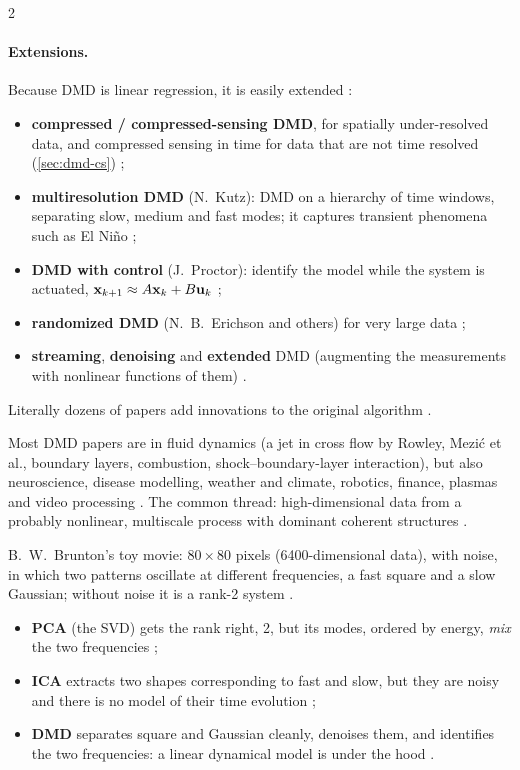 \begin{paracol}{2}
\paragraph{Extensions.} Because DMD is linear regression, it is easily extended :
\begin{itemize}
  \item \textbf{compressed / compressed-sensing DMD}, for spatially under-resolved data, and compressed
        sensing in time for data that are not time resolved (\cref{sec:dmd-cs}) ;
  \item \textbf{multiresolution DMD} (N.~Kutz): DMD on a hierarchy of time windows, separating slow,
        medium and fast modes; it captures transient phenomena such as El Ni\~no ;
  \item \textbf{DMD with control} (J.~Proctor): identify the model while the system is actuated,
        $\mathbf{x}_{k+1}\approx A\mathbf{x}_k+B\mathbf{u}_k$ ;
  \item \textbf{randomized DMD} (N.~B.~Erichson and others) for very large data ;
  \item \textbf{streaming}, \textbf{denoising} and \textbf{extended} DMD (augmenting the measurements with
        nonlinear functions of them) .
\end{itemize}
Literally dozens of papers add innovations to the original algorithm .

\begin{application}
Most DMD papers are in fluid dynamics (a jet in cross flow by Rowley, Mezi\'c et al., boundary layers,
combustion, shock--boundary-layer interaction), but also neuroscience, disease modelling, weather and
climate, robotics, finance, plasmas and video processing . The common
thread: high-dimensional data from a probably nonlinear, multiscale process with dominant coherent
structures .
\end{application}

\begin{casestudy}
B.~W.~Brunton's toy movie: $80\times80$ pixels (6400-dimensional data), with noise, in which two patterns
oscillate at different frequencies, a fast square and a slow Gaussian; without noise it is a rank-2
system .
\begin{itemize}
  \item \textbf{PCA} (the SVD) gets the rank right, 2, but its modes, ordered by energy, \emph{mix} the
        two frequencies ;
  \item \textbf{ICA} extracts two shapes corresponding to fast and slow, but they are noisy and there is no
        model of their time evolution ;
  \item \textbf{DMD} separates square and Gaussian cleanly, denoises them, and identifies the two
        frequencies: a linear dynamical model is under the hood .
\end{itemize}
\end{casestudy}


\end{paracol}
